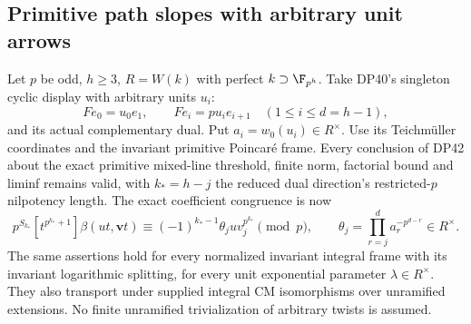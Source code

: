\subsection{Primitive path slopes with arbitrary unit arrows}

\begin{theorem}\label{DP46}
Let $p$ be odd, $h\ge3$, $R=W(k)$ with perfect $k\supset\F_{p^h}$.
Take DP40's singleton cyclic display with arbitrary units $u_i$:
\[
 Fe_0=u_0e_1,\qquad Fe_i=pu_ie_{i+1}\quad(1\le i\le d=h-1),
\]
and its actual complementary dual. Put $a_i=w_0(u_i)\in R^\times$.
Use its Teichm\"uller coordinates and the invariant primitive Poincar\'e frame.
Every conclusion of DP42 about the exact primitive mixed-line threshold, finite norm, factorial bound and liminf remains valid, with
$k_*=h-j$ the reduced dual direction's restricted-$p$ nilpotency length.
The exact coefficient congruence is now
\[
 p^{S_{k_*}}[t^{p^{k_*}+1}]\beta(ut,\mathbf vt)
 \equiv(-1)^{k_*-1}\theta_j u v_j^{p^{k_*}}\pmod p,\qquad
 \theta_j=\prod_{r=j}^{d}a_r^{-p^{d-r}}\in R^\times.
\]
The same assertions hold for every normalized invariant integral frame with its invariant logarithmic splitting, for every unit exponential parameter $\lambda\in R^\times$.
They also transport under supplied integral CM isomorphisms over unramified extensions. No finite unramified trivialization of arbitrary twists is assumed.
\end{theorem}

